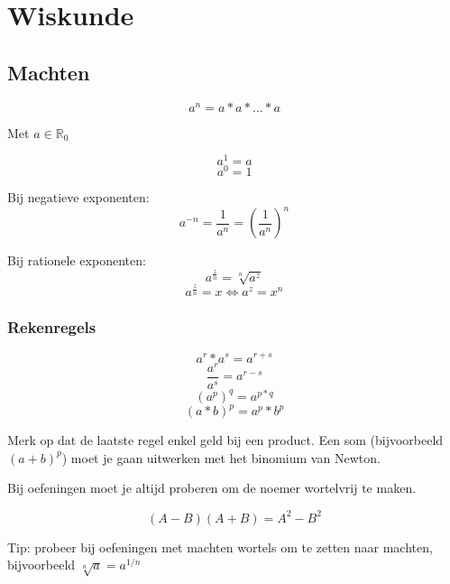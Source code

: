 \chapter{Wiskunde}

\section{Machten}

\[a^n = a * a * \ldots * a\]

Met \(a \in \mathbb{R}_{0} \)

\[a^1 = a\]
\[a^0 = 1\]


Bij negatieve exponenten:
\[a^{-n} = \frac{1}{a^n} = (\frac{1}{a^n})^n \]

Bij rationele exponenten:
\[a^\frac{z}{n} = \sqrt[n]{a^z} \]
\[a^\frac{z}{n} = x \iff a^z = x^n \]

\subsection{Rekenregels}

\[a^r * a^s = a^{r+s}\]
\[\frac{a^r}{a^s} = a^{r-s}\]
\[(a^p)^q = a ^{p*q}\]
\[(a*b)^p = a^p * b^p\]

Merk op dat de laatste regel enkel geld bij een product. Een som (bijvoorbeeld \( (a + b)^p \)) moet je gaan uitwerken met het binomium van Newton.

Bij oefeningen moet je altijd proberen om de noemer wortelvrij te maken.

\[(A-B)(A+B) = A^2 - B^2\]

Tip: probeer bij oefeningen met machten wortels om te zetten naar machten, bijvoorbeeld \( \sqrt[n]{a} = a^{1/n}  \)